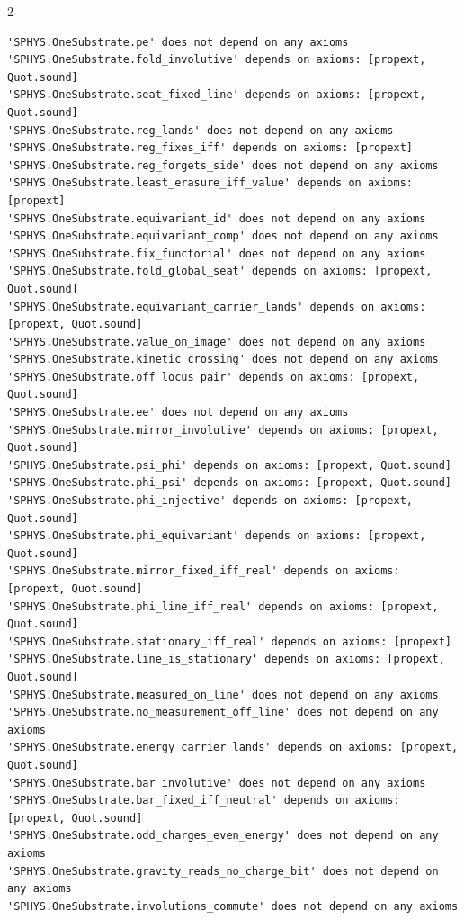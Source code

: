 \documentclass[10pt]{article}
\begin{document}
\begin{multicols}{2}
\begin{Verbatim}[fontsize=\fontsize{6.2}{7.2}\selectfont,breaklines,breakanywhere,breaksymbolleft={}]
'SPHYS.OneSubstrate.pe' does not depend on any axioms
'SPHYS.OneSubstrate.fold_involutive' depends on axioms: [propext, Quot.sound]
'SPHYS.OneSubstrate.seat_fixed_line' depends on axioms: [propext, Quot.sound]
'SPHYS.OneSubstrate.reg_lands' does not depend on any axioms
'SPHYS.OneSubstrate.reg_fixes_iff' depends on axioms: [propext]
'SPHYS.OneSubstrate.reg_forgets_side' does not depend on any axioms
'SPHYS.OneSubstrate.least_erasure_iff_value' depends on axioms: [propext]
'SPHYS.OneSubstrate.equivariant_id' does not depend on any axioms
'SPHYS.OneSubstrate.equivariant_comp' does not depend on any axioms
'SPHYS.OneSubstrate.fix_functorial' does not depend on any axioms
'SPHYS.OneSubstrate.fold_global_seat' depends on axioms: [propext, Quot.sound]
'SPHYS.OneSubstrate.equivariant_carrier_lands' depends on axioms: [propext, Quot.sound]
'SPHYS.OneSubstrate.value_on_image' does not depend on any axioms
'SPHYS.OneSubstrate.kinetic_crossing' does not depend on any axioms
'SPHYS.OneSubstrate.off_locus_pair' depends on axioms: [propext, Quot.sound]
'SPHYS.OneSubstrate.ee' does not depend on any axioms
'SPHYS.OneSubstrate.mirror_involutive' depends on axioms: [propext, Quot.sound]
'SPHYS.OneSubstrate.psi_phi' depends on axioms: [propext, Quot.sound]
'SPHYS.OneSubstrate.phi_psi' depends on axioms: [propext, Quot.sound]
'SPHYS.OneSubstrate.phi_injective' depends on axioms: [propext, Quot.sound]
'SPHYS.OneSubstrate.phi_equivariant' depends on axioms: [propext, Quot.sound]
'SPHYS.OneSubstrate.mirror_fixed_iff_real' depends on axioms: [propext, Quot.sound]
'SPHYS.OneSubstrate.phi_line_iff_real' depends on axioms: [propext, Quot.sound]
'SPHYS.OneSubstrate.stationary_iff_real' depends on axioms: [propext]
'SPHYS.OneSubstrate.line_is_stationary' depends on axioms: [propext, Quot.sound]
'SPHYS.OneSubstrate.measured_on_line' does not depend on any axioms
'SPHYS.OneSubstrate.no_measurement_off_line' does not depend on any axioms
'SPHYS.OneSubstrate.energy_carrier_lands' depends on axioms: [propext, Quot.sound]
'SPHYS.OneSubstrate.bar_involutive' does not depend on any axioms
'SPHYS.OneSubstrate.bar_fixed_iff_neutral' depends on axioms: [propext, Quot.sound]
'SPHYS.OneSubstrate.odd_charges_even_energy' does not depend on any axioms
'SPHYS.OneSubstrate.gravity_reads_no_charge_bit' does not depend on any axioms
'SPHYS.OneSubstrate.involutions_commute' does not depend on any axioms

\end{Verbatim}
\end{multicols}
\end{document}
